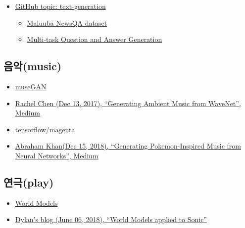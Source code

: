 \documentclass[smallextended]{svjour3}       %
\providecommand{\tightlist}{%
  \setlength{\itemsep}{0pt}\setlength{\parskip}{0pt}}
\begin{document}
\begin{itemize}
\tightlist
\item
  \href{https://github.com/topics/text-generation}{GitHub topic:
  text-generation}

  \begin{itemize}
  \tightlist
  \item
    \href{https://github.com/Maluuba/newsqa}{Maluuba NewsQA dataset}
  \item
    \href{https://github.com/Maluuba/qgen-workshop}{Multi-task Question
    and Answer Generation}
  \end{itemize}
\end{itemize}

\hypertarget{music-machine}{%
\subsection{음악(music)}\label{music-machine}}

\begin{itemize}
\tightlist
\item
  \href{https://salu133445.github.io/musegan/}{museGAN}
\item
  \href{https://medium.com/@rachelchen_49210/generating-ambient-noise-from-wavenet-95aa7f0a8f77}{Rachel
  Chen (Dec 13, 2017), ``Generating Ambient Music from WaveNet'',
  Medium}
\item
  \href{https://github.com/tensorflow/magenta}{tensorflow/magenta}
\item
  \href{https://towardsdatascience.com/generating-pokemon-inspired-music-from-neural-networks-bc240014132}{Abraham
  Khan(Dec 15, 2018), ``Generating Pokemon-Inspired Music from Neural
  Networks'', Medium}
\end{itemize}

\hypertarget{play-machine}{%
\subsection{연극(play)}\label{play-machine}}

\begin{itemize}
\tightlist
\item
  \href{https://worldmodels.github.io/}{World Models}
\item
  \href{https://dylandjian.github.io/world-models/}{Dylan's blog (June
  06, 2018), ``World Models applied to Sonic''}
\end{itemize}



\end{document}
